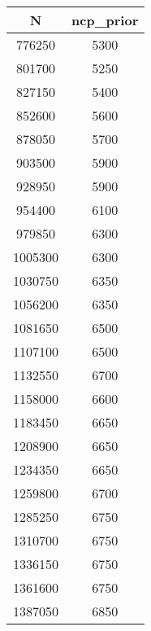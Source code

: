 \documentclass[10pt,a4paper]{report}
\begin{document}
\begin{tabular}{|c|c|}
\hline
N & ncp\_prior \\
\hline
776250 & 5300 \\
\hline
801700 & 5250 \\
\hline
827150 & 5400 \\
\hline
852600 & 5600 \\
\hline
878050 & 5700 \\
\hline
903500 & 5900 \\
\hline
928950 & 5900 \\
\hline
954400 & 6100 \\
\hline
979850 & 6300 \\
\hline
1005300 & 6300 \\
\hline
1030750 & 6350 \\
\hline
1056200 & 6350 \\
\hline
1081650 & 6500 \\
\hline
1107100 & 6500 \\
\hline
1132550 & 6700 \\
\hline
1158000 & 6600 \\
\hline
1183450 & 6650 \\
\hline
1208900 & 6650 \\
\hline
1234350 & 6650 \\
\hline
1259800 & 6700 \\
\hline
1285250 & 6750 \\
\hline
1310700 & 6750 \\
\hline
1336150 & 6750 \\
\hline
1361600 & 6750 \\
\hline
1387050 & 6850 \\
\hline
\end{tabular} 
\quad
\end{document}
